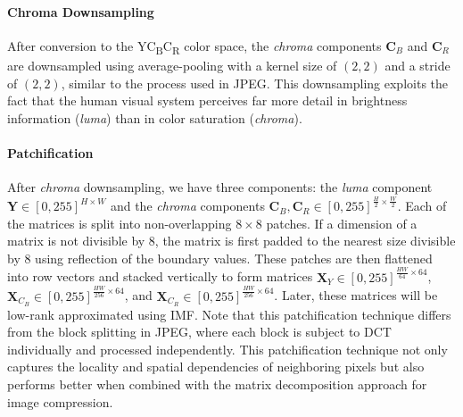 \paragraph{Chroma Downsampling}
After conversion to the YC\textsubscript{B}C\textsubscript{R} color space, the \emph{chroma} components $\bm{C}_B$ and $\bm{C}_R$ are downsampled using average-pooling with a kernel size of $(2, 2)$ and a stride of $(2, 2)$, similar to the process used in JPEG. This downsampling exploits the fact that the human visual system perceives far more detail in brightness information (\emph{luma}) than in color saturation (\emph{chroma}).

\paragraph{Patchification}
After \emph{chroma} downsampling, we have three components:  the \emph{luma} component $\bm{Y} \in [0, 255]^{H \times W}$ and the \emph{chroma} components $\bm{C}_B, \bm{C}_R \in [0, 255]^{\frac{H}{2} \times \frac{W}{2}}$. Each of the matrices is split into non-overlapping $8 \times 8$ patches. If a dimension of a matrix is not divisible by 8, the matrix is first padded to the nearest size divisible by 8 using reflection of the boundary values. These patches are then flattened into row vectors and stacked vertically to form matrices $\bm{X}_{Y} \in [0, 255]^{\frac{HW}{64} \times 64}$, $\bm{X}_{C_B} \in [0, 255]^{\frac{HW}{256} \times 64}$, and $\bm{X}_{C_R} \in [0, 255]^{\frac{HW}{256} \times 64}$. Later, these matrices will be low-rank approximated using IMF. Note that this patchification technique differs from the block splitting in JPEG, where each block is subject to DCT individually and processed independently. This patchification technique not only captures the locality and spatial dependencies of neighboring pixels but also performs better when combined with the matrix decomposition approach for image compression.

